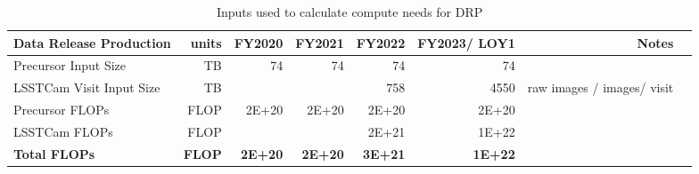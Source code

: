 \tiny \begin{longtable} { |p{}  |r  |r  |r  |r  |r  |r  |r |} 
\caption{Inputs used to calculate compute needs for DRP \label{tab:drpSizing}}\\ 
\hline 
{Data Release Production}&{units}&{FY2020}&{FY2021}&{FY2022}&{FY2023/ LOY1}&{Notes} \\ \hline
{Precursor Input Size}&{TB}&{74}&{74}&{74}&{74}& \\ \hline
{LSSTCam Visit Input Size}&{TB}&{}&{}&{758}&{4550}&{raw images /  images/ visit} \\ \hline
{Precursor FLOPs}&{FLOP}&{2E+20}&{2E+20}&{2E+20}&{2E+20}& \\ \hline
{LSSTCam FLOPs}&{FLOP}&{}&{}&{2E+21}&{1E+22}& \\ \hline
\textbf{Total FLOPs}&\textbf{FLOP}&\textbf{2E+20}&\textbf{2E+20}&\textbf{3E+21}&\textbf{1E+22}& \\ \hline
\end{longtable} \normalsize
